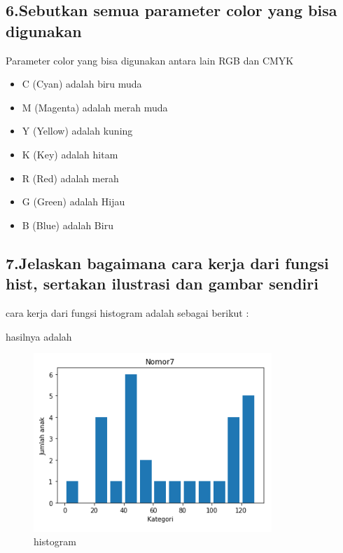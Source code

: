 \subsection{6.Sebutkan semua parameter color yang bisa digunakan}
Parameter color yang bisa digunakan antara lain RGB dan CMYK
\begin{itemize}
\item C (Cyan) adalah biru muda
\item M (Magenta) adalah merah muda
\item Y (Yellow) adalah kuning
\item K (Key) adalah hitam
\item R (Red) adalah merah
\item G (Green) adalah Hijau
\item B (Blue) adalah Biru
\end{itemize}

\subsection{7.Jelaskan bagaimana cara kerja dari fungsi hist, sertakan ilustrasi dan gambar sendiri}
cara kerja dari fungsi histogram adalah sebagai berikut :

hasilnya adalah
\begin{figure}[H]
\includegraphics[width=9cm]{figures/6/Teori/1174005/7his.png}
\caption{histogram}
\centering
\end{figure}

